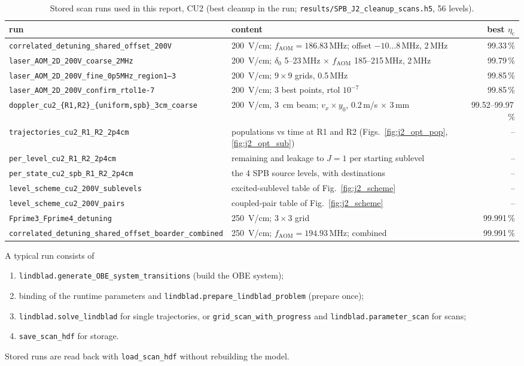 \documentclass[11pt,a4paper,oneside]{report}
\newcommand{\code}[1]{\texttt{#1}}
\newcommand{\etac}{\eta_{\mathrm{c}}}
\newcommand{\fAOM}{f_{\mathrm{AOM}}}
\begin{document}
\begin{table}[htbp]
  \centering
  \caption[Stored scan runs, CU2]{Stored scan runs used in this report, CU2 (best cleanup in the run; \code{results/SPB\_J2\_cleanup\_scans.h5}, 56 levels).}
  \label{tab:runs_j2}
  \small
  \begin{tabularx}{\textwidth}{lLr}
    \toprule
    run & content & best $\etac$ \\
    \midrule
    \code{correlated\_detuning\_shared\_offset\_200V} & \SI{200}{V/cm}; $\fAOM=186.83$\,MHz; offset $-10\ldots8$\,MHz, 2\,MHz & 99.33\,\% \\
    \code{laser\_AOM\_2D\_200V\_coarse\_2MHz} & \SI{200}{V/cm}; $\delta_0$ 5--23\,MHz $\times$ $\fAOM$ 185--215\,MHz, 2\,MHz & 99.79\,\% \\
    \code{laser\_AOM\_2D\_200V\_fine\_0p5MHz\_region1--3} & \SI{200}{V/cm}; $9\times9$ grids, 0.5\,MHz & 99.85\,\% \\
    \code{laser\_AOM\_2D\_200V\_confirm\_rtol1e-7} & \SI{200}{V/cm}; 3 best points, rtol $10^{-7}$ & 99.85\,\% \\
    \code{doppler\_cu2\_\{R1,R2\}\_\{uniform,spb\}\_3cm\_coarse} & \SI{200}{V/cm}, \SI{3}{cm} beam; $v_x\times y_0$, 0.2\,m/s $\times$ 3\,mm & 99.52--99.97\,\% \\
    \code{trajectories\_cu2\_R1\_R2\_2p4cm} & populations vs time at R1 and R2 (Figs.~\ref{fig:j2_opt_pop}, \ref{fig:j2_opt_sub}) & -- \\
    \code{per\_level\_cu2\_R1\_R2\_2p4cm} & remaining and leakage to $J=1$ per starting sublevel & -- \\
    \code{per\_state\_cu2\_spb\_R1\_R2\_2p4cm} & the 4 SPB source levels, with destinations & -- \\
    \code{level\_scheme\_cu2\_200V\_sublevels} & excited-sublevel table of Fig.~\ref{fig:j2_scheme} & -- \\
    \code{level\_scheme\_cu2\_200V\_pairs} & coupled-pair table of Fig.~\ref{fig:j2_scheme} & -- \\
    \code{Fprime3\_Fprime4\_detuning} & \SI{250}{V/cm}; $3\times3$ grid & 99.991\,\% \\
    \code{correlated\_detuning\_shared\_offset\_boarder\_combined} & \SI{250}{V/cm}; $\fAOM=194.93$\,MHz; combined & 99.991\,\% \\
    \bottomrule
  \end{tabularx}
\end{table}

A typical run consists of
\begin{enumerate}[itemsep=0pt,topsep=2pt]
  \item \code{lindblad.generate\_OBE\_system\_transitions} (build the OBE system);
  \item binding of the runtime parameters and \code{lindblad.prepare\_lindblad\_problem}
        (prepare once);
  \item \code{lindblad.solve\_lindblad} for single trajectories, or
        \code{grid\_scan\_with\_progress} and \code{lindblad.parameter\_scan} for scans;
  \item \code{save\_scan\_hdf} for storage.
\end{enumerate}
Stored runs are read back with \code{load\_scan\_hdf} without rebuilding the model.
\end{document}
